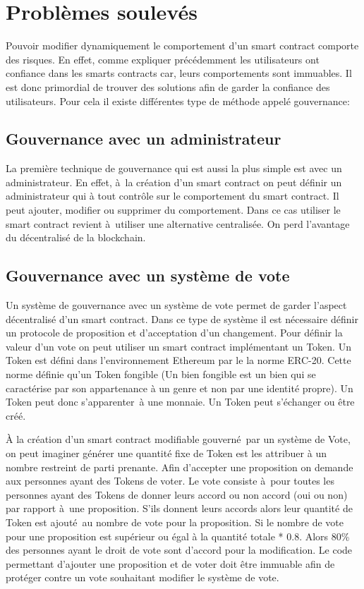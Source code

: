 \section{Problèmes soulevés}

Pouvoir modifier dynamiquement le comportement d'un smart contract comporte des risques.
En effet, comme expliquer précédemment les utilisateurs ont confiance dans les smarts contracts
car, leurs comportements sont immuables. Il est donc primordial de trouver des solutions afin de garder
la confiance des utilisateurs. Pour cela il existe différentes type de méthode appelé gouvernance:

\subsection{Gouvernance avec un administrateur}

La première technique de gouvernance qui est aussi la plus simple est avec un administrateur.
En effet, à la création d'un smart contract on peut définir un administrateur qui à tout contrôle
sur le comportement du smart contract. Il peut ajouter, modifier ou supprimer du comportement.
Dans ce cas utiliser le smart contract revient à utiliser une alternative centralisée. On perd
l'avantage du décentralisé de la blockchain.

\subsection{Gouvernance avec un système de vote}

Un système de gouvernance avec un système de vote permet de garder l'aspect décentralisé d'un smart contract.
Dans ce type de système il est nécessaire définir un protocole de proposition et d'acceptation
d'un changement. Pour définir la valeur d'un vote on peut utiliser un smart contract implémentant un Token.
Un Token est défini dans l'environnement Ethereum par le la norme ERC-20. Cette norme définie qu'un Token
fongible (Un bien fongible est un bien qui se caractérise par son appartenance à un genre et non par 
une identité propre). Un Token peut donc s'apparenter à une monnaie. Un Token peut s'échanger ou être créé.

À la création d'un smart contract modifiable gouverné par un système de Vote, on peut imaginer générer une quantité
fixe de Token est les attribuer à un nombre restreint de parti prenante. Afin d'accepter une proposition on demande
aux personnes ayant des Tokens de voter. Le vote consiste à pour toutes les personnes ayant des Tokens de donner leurs
accord ou non accord (oui ou non) par rapport à une proposition. S'ils donnent leurs accords alors leur quantité 
de Token est ajouté au nombre de vote pour la proposition. Si le nombre de vote pour une proposition est supérieur ou
égal à la quantité totale * 0.8. Alors 80\% des personnes ayant le droit de vote sont d'accord pour la modification.
Le code permettant d'ajouter une proposition et de voter doit être immuable afin de protéger contre un vote
souhaitant modifier le système de vote.

